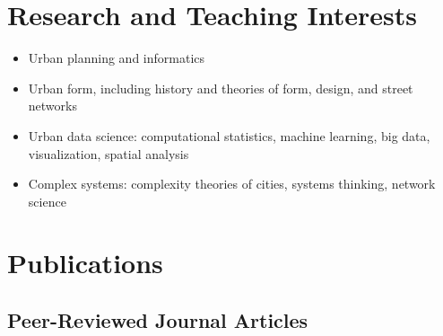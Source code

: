 \documentclass{academiccv}
\begin{document}
\section*{Research and Teaching Interests}

\begin{itemize}
	
\item Urban planning and informatics

\item Urban form, including history and theories of form, design, and street networks

\item Urban data science: computational statistics, machine learning, big data, visualization, spatial analysis

\item Complex systems: complexity theories of cities, systems thinking, network science

\end{itemize}



\section*{Publications}

\subsection*{Peer-Reviewed Journal Articles}
\end{document}
